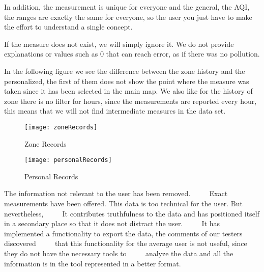 In addition, the measurement is unique for everyone and the general, the AQI, the ranges are exactly the same for everyone, so the user
you just have to make the effort to understand a single concept.

If the measure does not exist, we will simply ignore it. We do not provide explanations or values such as 0 that can reach
error, as if there was no pollution.


In the following figure we see the difference between the zone history and the personalized, the first of them does not show
the point where the measure was taken since it has been selected in the main map. We also like for the history of
zone there is no filter for hours, since the measurements are reported every hour, this means that we will not find
intermediate measures in the data set.
 
\begin{figure}[ht]
    \centering
    \texttt{[image: zoneRecords]}
    \caption{Zone Records}
\end{figure}
\begin{figure}[ht]
    \centering
    \texttt{[image: personalRecords]}
    \caption{Personal Records}
\end{figure}


\begin{itemize}
    \done The information not relevant to the user has been removed.
         \crossed Exact measurements have been offered. This data is too technical for the user. But nevertheless,
         It contributes truthfulness to the data and has positioned itself in a secondary place so that it does not distract the user.
         \crossed It has implemented a functionality to export the data, the comments of our testers discovered
         that this functionality for the average user is not useful, since they do not have the necessary tools to
         analyze the data and all the information is in the tool represented in a better format.
    
\end{itemize}
 \newpage